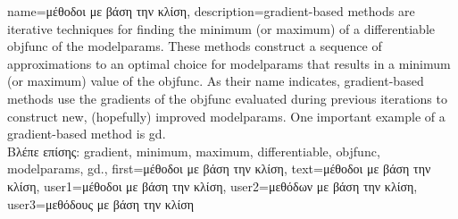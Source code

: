 {name={\foreignlanguage{greek}{μέθοδοι με βάση την κλίση}}, 
	description={\Gls{gradient}-based 
		methods are iterative techniques for finding the \gls{minimum} (or \gls{maximum}) 
		of a \gls{differentiable} \gls{objfunc} of the \gls{modelparams}. These 
		methods construct a sequence of approximations to an optimal choice for 
		\gls{modelparams} that results in a \gls{minimum} (or \gls{maximum}) value of the \gls{objfunc}. 
		As their name indicates, \gls{gradient}-based methods use the \gls{gradient}s of the \gls{objfunc} 
		evaluated during previous iterations to construct new, (hopefully) improved \gls{modelparams}. 
		One important example of a \gls{gradient}-based method is \gls{gd}.\\
		\foreignlanguage{greek}{Βλέπε επίσης:} \gls{gradient}, \gls{minimum}, \gls{maximum}, \gls{differentiable}, \gls{objfunc}, \gls{modelparams}, \gls{gd}.},
		first={\foreignlanguage{greek}{μέθοδοι με βάση την κλίση}},
		text={\foreignlanguage{greek}{μέθοδοι με βάση την κλίση}},
		user1={\foreignlanguage{greek}{μέθοδοι με βάση την κλίση}}, %
		user2={\foreignlanguage{greek}{μεθόδων με βάση την κλίση}}, %
		user3={\foreignlanguage{greek}{μεθόδους με βάση την κλίση}} %
}

